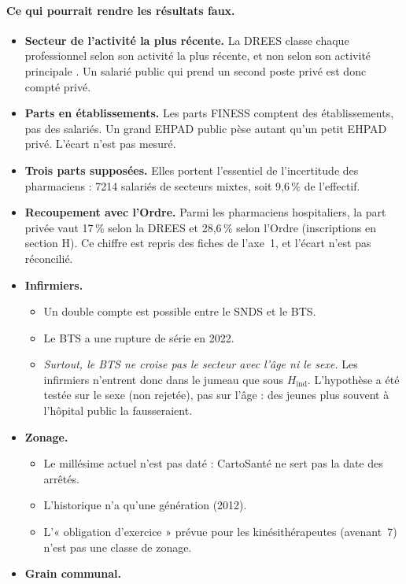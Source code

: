 \paragraph{Ce qui pourrait rendre les résultats faux.}
\begin{itemize}
  \item \textbf{Secteur de l'activité la plus récente.} La DREES classe chaque professionnel selon son activité la
  plus récente, et non selon son activité principale \citep{a4-drees2026demo}. Un salarié public qui prend un second
  poste privé est donc compté privé.
  \item \textbf{Parts en établissements.} Les parts FINESS comptent des établissements, pas des salariés. Un grand
  EHPAD public pèse autant qu'un petit EHPAD privé. L'écart n'est pas mesuré.
  \item \textbf{Trois parts supposées.} Elles portent l'essentiel de l'incertitude des pharmaciens : \num{7214}
  salariés de secteurs mixtes, soit 9,6\,\% de l'effectif\derive{}.
  \item \textbf{Recoupement avec l'Ordre.} Parmi les pharmaciens hospitaliers, la part privée vaut 17\,\% selon la
  DREES et 28,6\,\% selon l'Ordre (inscriptions en section H). Ce chiffre est repris des fiches de l'axe~1, et
  l'écart n'est pas réconcilié.
  \item \textbf{Infirmiers.}
  \begin{itemize}
    \item Un double compte est possible entre le SNDS et le BTS.
    \item Le BTS a une rupture de série en 2022.
    \item \emph{Surtout, le BTS ne croise pas le secteur avec l'âge ni le sexe.} Les infirmiers n'entrent
    donc dans le jumeau que sous $H_{\mathrm{ind}}$. L'hypothèse a été testée sur le sexe (non rejetée), pas sur
    l'âge : des jeunes plus souvent à l'hôpital public la fausseraient.
  \end{itemize}
  \item \textbf{Zonage.}
  \begin{itemize}
    \item Le millésime actuel n'est pas daté : CartoSanté ne sert pas la date des arrêtés.
    \item L'historique n'a qu'une génération (2012).
    \item L'« obligation d'exercice » prévue pour les kinésithérapeutes (avenant~7) n'est pas une classe de zonage.
  \end{itemize}
  \item \textbf{Grain communal.}

\end{itemize}
